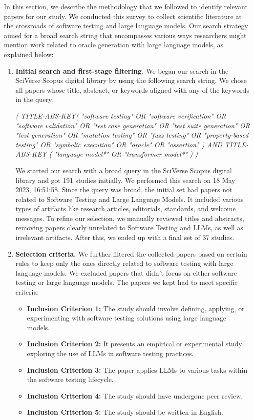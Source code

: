 In this section, we describe the methodology that we followed to identify relevant papers for our study. We conducted this survey to collect scientific literature at the crossroads of software testing and large language models. Our search strategy aimed for a broad search string that encompasses various ways researchers might mention work related to oracle generation with large language models, as explained below:

\begin{enumerate}[label=\textbf{\arabic*.}]
  \item\textbf{Initial search and first-stage filtering.} We began our search in the SciVerse Scopus digital library by using the following search string. We chose all papers whose title, abstract, or keywords aligned with any of the keywords in the query:

  \textit{( TITLE-ABS-KEY( "software testing" OR "software verification" OR "software validation" OR "test case generation" OR "test suite generation" OR "test generation" OR "mutation testing" OR "fuzz testing" OR "property-based testing" OR "symbolic execution" OR "oracle" OR "assertion" ) AND TITLE-ABS-KEY ( "language model*" OR "transformer model*" ) )}

  We started our search with a broad query in the SciVerse Scopus digital library and got 191 studies initially. We performed this search on 18 May 2023, 16:51:58. Since the query was broad, the initial set had papers not related to Software Testing and Large Language Models. It included various types of artifacts like research articles, editorials, standards, and welcome messages. To refine our selection, we manually reviewed titles and abstracts, removing papers clearly unrelated to Software Testing and LLMs, as well as irrelevant artifacts. After this, we ended up with a final set of 37 studies.
  
  \item\textbf{Selection criteria.} We further filtered the collected papers based on certain rules to keep only the ones directly related to software testing with large language models. We excluded papers that didn't focus on either software testing or large language models. The papers we kept had to meet specific criteria:
      \begin{itemize}
            \item \textbf{Inclusion Criterion 1:} The study should involve defining, applying, or experimenting with software testing solutions using large language models.
            \item \textbf{Inclusion Criterion 2:} It presents an empirical or experimental study exploring the use of LLMs in software testing practices.
            \item \textbf{Inclusion Criterion 3:} The paper applies LLMs to various tasks within the software testing lifecycle.
            \item \textbf{Inclusion Criterion 4:} The study should have undergone peer review.
            \item \textbf{Inclusion Criterion 5:} The study should be written in English.
            

\end{itemize}
\end{enumerate}
